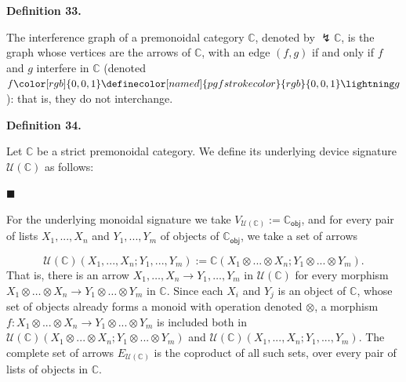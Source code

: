  
 
\par\medskip\noindent\textbf{Definition 33.}\par
 
 
The interference graph of a premonoidal category $\mathbb{C}$, denoted by ${\lightning}\mathbb{C}$, is the graph whose vertices are the arrows of $\mathbb{C}$, with an edge $(f,g)$ if and only if $f$ and $g$ interfere in $\mathbb{C}$ (denoted $f{\color[rgb]{0,0,1}\definecolor[named]{pgfstrokecolor}{rgb}{0,0,1}\lightning}g$): that is, they do not interchange.\par
 
 
 
 
\par\medskip\noindent\textbf{Definition 34.}\par
 
 
Let $\mathbb{C}$ be a strict premonoidal category. We define its underlying device signature $\mathcal{U}(\mathbb{C})$ as follows:\par
  
\par\noindent  $\blacksquare$ 
 
For the underlying monoidal signature we take $V_{\mathcal{U}(\mathbb{C})}:=\mathbb{C}_{\mathsf{obj}}$, and for every pair of lists $X_{1},...,X_{n}$ and $Y_{1},...,Y_{m}$ of objects of $\mathbb{C}_{\mathsf{obj}}$, we take a set of arrows\par
    \[\mathcal{U}(\mathbb{C})(X_{1},...,X_{n};Y_{1},...,Y_{m}):=\mathbb{C}(X_{1}\otimes...\otimes X_{n};Y_{1}\otimes...\otimes Y_{m}).\]    
That is, there is an arrow $X_{1},\ldots,X_{n}\to Y_{1},\ldots,Y_{m}$ in $\mathcal{U}(\mathbb{C})$ for every morphism $X_{1}\otimes\ldots\otimes X_{n}\to Y_{1}\otimes\ldots\otimes Y_{m}$ in $\mathbb{C}$. Since each $X_{i}$ and $Y_{j}$ is an object of $\mathbb{C}$, whose set of objects already forms a monoid with operation denoted $\otimes$, a morphism $f:X_{1}\otimes...\otimes X_{n}\to Y_{1}\otimes...\otimes Y_{m}$ is included both in $\mathcal{U}(\mathbb{C})(X_{1}\otimes...\otimes X_{n};Y_{1}\otimes...\otimes Y_{m})$ and $\mathcal{U}(\mathbb{C})(X_{1},...,X_{n};Y_{1},...,Y_{m})$. The complete set of arrows $E_{\mathcal{U}(\mathbb{C})}$ is the coproduct of all such sets, over every pair of lists of objects in $\mathbb{C}$.\par
 

